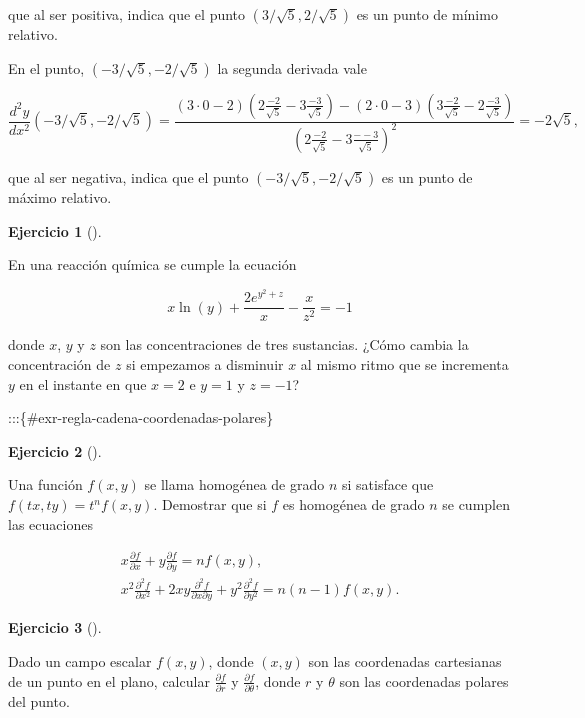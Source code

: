 \documentclass[
  a4paper,
]{scrreport}
\theoremstyle{definition}
\newtheorem{exercise}{Ejercicio}[chapter]
\theoremstyle{remark}
\begin{document}
\begin{tcolorbox}
que al ser positiva, indica que el punto \((3/\sqrt{5},2/\sqrt{5})\) es
un punto de mínimo relativo.

En el punto, \((-3/\sqrt{5},-2/\sqrt{5})\) la segunda derivada vale

\[
\frac{d^{2}y}{dx^{2}}(-3/\sqrt{5},-2/\sqrt{5})=
\frac{(3\cdot 0-2)(2\frac{-2}{\sqrt{5}}-3\frac{-3}{\sqrt{5}})-(2\cdot 0-3)(3\frac{-2}{\sqrt{5}}-2\frac{-3}{\sqrt{5}})}{(2\frac{-2}{\sqrt{5}}-3\frac{--3}{\sqrt{5}})^{2}} = -2\sqrt{5},
\]

que al ser negativa, indica que el punto \((-3/\sqrt{5},-2/\sqrt{5})\)
es un punto de máximo relativo.

\end{tcolorbox}

\begin{exercise}[]\protect\hypertarget{exr-derivada-implicita-direccional}{}\label{exr-derivada-implicita-direccional}

En una reacción química se cumple la ecuación

\[
x\ln(y)+\frac{2e^{y^2+z}}{x} - \frac{x}{z^2} = -1
\]

donde \(x\), \(y\) y \(z\) son las concentraciones de tres sustancias.
¿Cómo cambia la concentración de \(z\) si empezamos a disminuir \(x\) al
mismo ritmo que se incrementa \(y\) en el instante en que \(x=2\) e
\(y=1\) y \(z=-1\)?

\end{exercise}

:::\{\#exr-regla-cadena-coordenadas-polares\}

\begin{exercise}[]\protect\hypertarget{exr-funcion-homogenea}{}\label{exr-funcion-homogenea}

Una función \(f(x,y)\) se llama homogénea de grado \(n\) si satisface
que \(f(tx, ty) = t^nf(x,y)\). Demostrar que si \(f\) es homogénea de
grado \(n\) se cumplen las ecuaciones

\[
\begin{gathered}
x\frac{\partial f}{\partial x} + y \frac{\partial f}{\partial y} = nf(x,y),\\
x^2\frac{\partial^2 f}{\partial x^2} + 2xy \frac{\partial^2 f}{\partial x \partial y} + y^2 \frac{\partial^2 f}{\partial y^2} = n(n-1)f(x,y).
\end{gathered}
\]

\end{exercise}

\begin{exercise}[]\protect\hypertarget{exr-regla-cadena-coordenadas-polares}{}\label{exr-regla-cadena-coordenadas-polares}

Dado un campo escalar \(f(x,y)\), donde \((x,y)\) son las coordenadas
cartesianas de un punto en el plano, calcular
\(\frac{\partial f}{\partial r}\) y
\(\frac{\partial f}{\partial \theta}\), donde \(r\) y \(\theta\) son las
coordenadas polares del punto.

\end{exercise}
\end{document}
